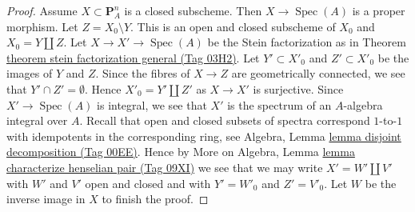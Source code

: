 \documentclass{amsart}
\theoremstyle{plain}
\theoremstyle{definition}
\theoremstyle{remark}
\numberwithin{equation}{subsection}
\def\Spec{\mathop{\mathrm{Spec}}}
\begin{document}
\begin{proof}
\medskip\noindent
Assume $X \subset \mathbf{P}^n_A$ is a closed subscheme.
Then $X \to \Spec(A)$ is a proper morphism.
Let $Z = X_0 \setminus Y$. This is an open and closed
subscheme of $X_0$ and $X_0 = Y \amalg Z$.
Let $X \to X' \to \Spec(A)$ be the Stein factorization as in
Theorem \href{https://stacks.math.columbia.edu/tag/03H2}{theorem stein factorization general (Tag 03H2)}.
Let $Y' \subset X'_0$ and $Z' \subset X'_0$ be the images of
$Y$ and $Z$.
Since the fibres of $X \to Z$ are geometrically connected,
we see that $Y' \cap Z' = \emptyset$.
Hence $X'_0 = Y' \amalg Z'$ as $X \to X'$ is surjective.
Since $X' \to \Spec(A)$ is integral, we see that
$X'$ is the spectrum of an $A$-algebra integral over $A$.
Recall that open and closed subsets of spectra correspond
$1$-to-$1$ with idempotents in the corresponding ring, see
Algebra, Lemma \href{https://stacks.math.columbia.edu/tag/00EE}{lemma disjoint decomposition (Tag 00EE)}.
Hence by
More on Algebra, Lemma \href{https://stacks.math.columbia.edu/tag/09XI}{lemma characterize henselian pair (Tag 09XI)}
we see that we may write $X' = W' \amalg V'$
with $W'$ and $V'$ open and closed and
with $Y' = W'_0$ and $Z' = V'_0$.
Let $W$ be the inverse image in $X$
to finish the proof.
\end{proof}
\end{document}
